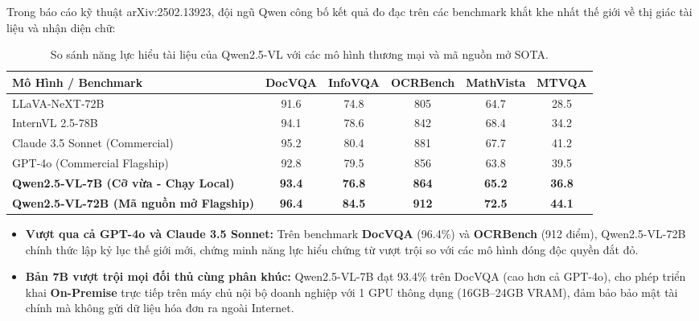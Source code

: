 \documentclass[11pt,a4paper]{article}
\begin{document}
\begin{benchmarkbox}
Trong báo cáo kỹ thuật arXiv:2502.13923, đội ngũ Qwen công bố kết quả đo đạc trên các benchmark khắt khe nhất thế giới về thị giác tài liệu và nhận diện chữ:

\begin{table}[H]
\centering
\footnotesize
\begin{tabularx}{\linewidth}{>{\raggedright\arraybackslash}Xccccc}
\toprule
\textbf{Mô Hình / Benchmark} & \textbf{DocVQA} & \textbf{InfoVQA} & \textbf{OCRBench} & \textbf{MathVista} & \textbf{MTVQA} \\
\midrule
LLaVA-NeXT-72B & 91.6 & 74.8 & 805 & 64.7 & 28.5 \\
InternVL 2.5-78B & 94.1 & 78.6 & 842 & 68.4 & 34.2 \\
Claude 3.5 Sonnet (Commercial) & 95.2 & 80.4 & 881 & 67.7 & 41.2 \\
GPT-4o (Commercial Flagship) & 92.8 & 79.5 & 856 & 63.8 & 39.5 \\
\midrule
\textbf{Qwen2.5-VL-7B (Cỡ vừa - Chạy Local)} & \textbf{93.4} & \textbf{76.8} & \textbf{864} & \textbf{65.2} & \textbf{36.8} \\
\textbf{Qwen2.5-VL-72B (Mã nguồn mở Flagship)} & \textbf{96.4} & \textbf{84.5} & \textbf{912} & \textbf{72.5} & \textbf{44.1} \\
\bottomrule
\end{tabularx}
\caption{So sánh năng lực hiểu tài liệu của Qwen2.5-VL với các mô hình thương mại và mã nguồn mở SOTA.}
\end{table}
\end{benchmarkbox}

\begin{itemize}[leftmargin=1.5em]
    \item \textbf{Vượt qua cả GPT-4o và Claude 3.5 Sonnet:} Trên benchmark \textbf{DocVQA} (96.4\%) và \textbf{OCRBench} (912 điểm), Qwen2.5-VL-72B chính thức lập kỷ lục thế giới mới, chứng minh năng lực hiểu chứng từ vượt trội so với các mô hình đóng độc quyền đắt đỏ.
    \item \textbf{Bản 7B vượt trội mọi đối thủ cùng phân khúc:} Qwen2.5-VL-7B đạt 93.4\% trên DocVQA (cao hơn cả GPT-4o), cho phép triển khai \textbf{On-Premise} trực tiếp trên máy chủ nội bộ doanh nghiệp với 1 GPU thông dụng (16GB--24GB VRAM), đảm bảo bảo mật tài chính mà không gửi dữ liệu hóa đơn ra ngoài Internet.
\end{itemize}
\end{document}
